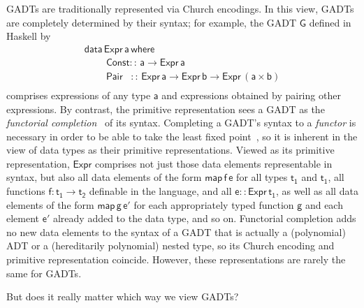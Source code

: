 \documentclass[acmsmall,screen,review,anonymous]{acmart}
\theoremstyle{definition}
\begin{document}
GADTs are traditionally represented via Church encodings. In this
view, GADTs are completely determined by their syntax; for example,
the GADT $\mathsf{G}$ defined in Haskell by
\begin{equation}\label{eq:example-GADT}
\begin{array}{l}
\mathsf{data\, Expr\,a\,where}\\
\mathsf{\;\;\;\;\;\;\;\;Const ::\, a \to Expr\,a}\\
\mathsf{\;\;\;\;\;\;\;\;Pair\,\,\,\,\, ::\, Expr \,a \to Expr\,b \to
  Expr\,(a \times b)}\\ 
\end{array}
\end{equation}
\noindent
comprises expressions of any type $\mathsf{a}$ and expressions
obtained by pairing other expressions. By contrast, the primitive
representation sees a GADT as the {\em functorial
  completion}~\cite{jp19} of its syntax. Completing a GADT's syntax to
a {\em functor} is necessary in order to be able to take the least
fixed point~\cite{tfca}, so it is inherent in the view of data types
as their primitive representations.  Viewed as its primitive
representation, $\mathsf{Expr}$ comprises not just those data elements
representable in syntax, but also all data elements of the form
$\mathsf{map\,f\,e}$ for all types $\mathsf{t_1}$ and $\mathsf{t_1}$,
all functions $\mathsf{f : t_1 \to t_2}$ definable in the language,
and all $\mathsf{e :: Expr\,t_1}$, as well as all data elements of the
form $\mathsf{map\,g\,e'}$ for each appropriately typed function
$\mathsf{g}$ and each element $\mathsf{e'}$ already added to the data
type, and so on. Functorial completion adds no new data elements to
the syntax of a GADT that is actually a (polynomial) ADT or a
(hereditarily polynomial) nested type, so its Church encoding and
primitive representation coincide. However, these representations are
rarely the same for GADTs.

But does it really matter which way we view GADTs?
\end{document}
